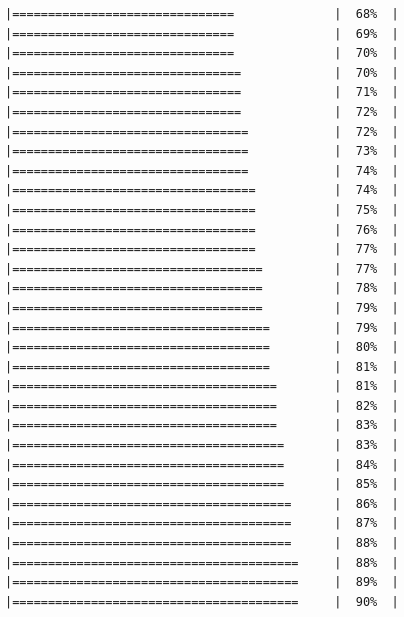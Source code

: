 \documentclass[
  krantz2]{krantz}
\begin{document}
\begin{verbatim}
|===============================              |  68%  |                                                     |===============================              |  69%  |                                                     |===============================              |  70%  |                                                     |================================             |  70%  |                                                     |================================             |  71%  |                                                     |================================             |  72%  |                                                     |=================================            |  72%  |                                                     |=================================            |  73%  |                                                     |=================================            |  74%  |                                                     |==================================           |  74%  |                                                     |==================================           |  75%  |                                                     |==================================           |  76%  |                                                     |==================================           |  77%  |                                                     |===================================          |  77%  |                                                     |===================================          |  78%  |                                                     |===================================          |  79%  |                                                     |====================================         |  79%  |                                                     |====================================         |  80%  |                                                     |====================================         |  81%  |                                                     |=====================================        |  81%  |                                                     |=====================================        |  82%  |                                                     |=====================================        |  83%  |                                                     |======================================       |  83%  |                                                     |======================================       |  84%  |                                                     |======================================       |  85%  |                                                     |=======================================      |  86%  |                                                     |=======================================      |  87%  |                                                     |=======================================      |  88%  |                                                     |========================================     |  88%  |                                                     |========================================     |  89%  |                                                     |========================================     |  90%  |                        
\end{verbatim}
\end{document}
